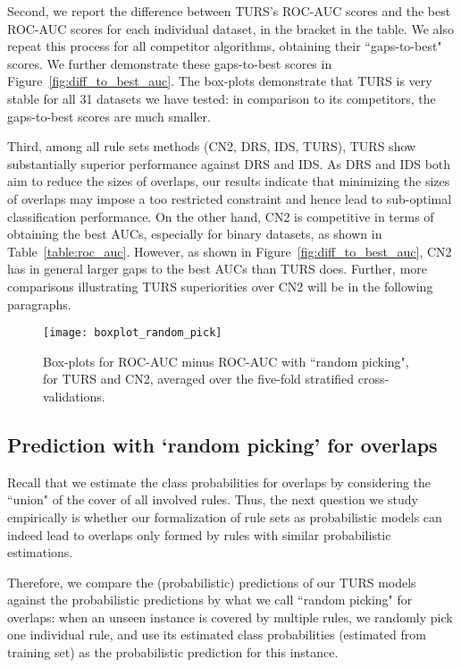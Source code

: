 Second, we report the difference between TURS's ROC-AUC scores and the best ROC-AUC scores for each individual dataset, in the bracket in the table. We also repeat this process for all competitor algorithms, obtaining their ``gaps-to-best" scores. We further demonstrate these gaps-to-best scores in Figure~\ref{fig:diff_to_best_auc}. The box-plots demonstrate that TURS is very stable for all 31 datasets we have tested: in comparison to its competitors, the gaps-to-best scores are much smaller. 

Third, among all rule sets methods (CN2, DRS, IDS, TURS), TURS show substantially superior performance against DRS and IDS. As DRS and IDS both aim to reduce the sizes of overlaps, our results indicate that minimizing the sizes of overlaps may impose a too restricted constraint and hence lead to sub-optimal classification performance. On the other hand, CN2 is competitive in terms of obtaining the best AUCs, especially for binary datasets, as shown in Table~\ref{table:roc_auc}. However,  as shown in Figure~\ref{fig:diff_to_best_auc}, CN2 has in general larger gaps to the best AUCs than TURS does. Further, more comparisons illustrating TURS superiorities over CN2 will be in the following paragraphs. 


\begin{figure}[ht] \centering
\texttt{[image: boxplot\_random\_pick]}	
\caption{Box-plots for ROC-AUC minus ROC-AUC with ``random picking", for TURS and CN2, averaged over the five-fold stratified cross-validations. } \label{fig:diff_rp}
\end{figure}

\subsection{Prediction with `random picking' for overlaps}
Recall that we estimate the class probabilities for overlaps by considering the ``union" of the cover of all involved rules. Thus, the next question we study empirically is whether our formalization of rule sets as probabilistic models can indeed lead to overlaps only formed by rules with similar probabilistic estimations. 

Therefore, we compare the (probabilistic) predictions of our TURS models against the probabilistic predictions by what we call ``random picking" for overlaps: when an unseen instance is covered by multiple rules, we randomly pick one individual rule, and use its estimated class probabilities (estimated from training set) as the probabilistic prediction for this instance. 

